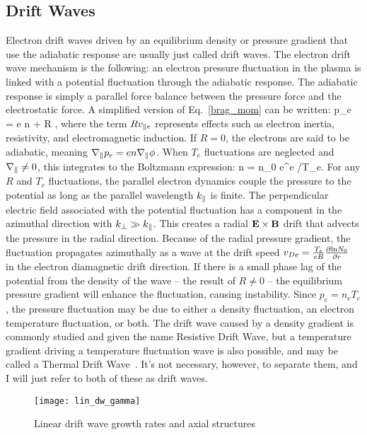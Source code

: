 \subsection{Drift Waves}
\label{ss_drift_waves}

Electron drift waves driven by an equilibrium density or pressure gradient that use the adiabatic response are usually just called drift waves.
The electron drift wave mechanism is the following: an electron pressure fluctuation in the plasma is linked with a potential fluctuation through the adiabatic response. The adiabatic
response is simply a parallel force balance between the pressure force and the electrostatic force. A simplified version of Eq.~\ref{brag_mom} can be written:
\beq
\label{adiabatic_response}
\gradpar p_e = e n \gradpar \phi + R \vpe,
\eeq
where the term $R v_{\parallel e}$ represents effects such as electron inertia, resistivity, and electromagnetic induction. If $R=0$, the electrons are said to be adiabatic, meaning 
$\nabla_\parallel p_e = e n \nabla_\parallel \phi$. When $T_e$ fluctuations are neglected and $\nabla_\parallel \ne 0$, this integrates to the Boltzmann expression:
\beq
\label{boltzmann_exp}
n = n_0 e^{e \phi/T_e}.
\eeq
For any $R$ and $T_e$ fluctuations, the parallel electron dynamics couple the pressure to the potential as long as the parallel wavelength $k_\parallel$ is finite. 
The perpendicular electric field associated with the potential fluctuation has a component in the azimuthal direction with $k_\perp \gg k_\parallel$. 
This creates a radial ${\bf E \times B}$ drift that advects the pressure in the radial direction. Because of the radial pressure gradient,
the fluctuation propagates azimuthally as a wave at the drift speed $v_{De} = \frac{T_e}{e B} \frac{\partial{\rm ln} N_0}{\partial r}$~\cite{chen2006} in the electron diamagnetic drift direction. 
If there is a small phase lag of the potential from the density of the wave -- the result of $R \ne 0$ -- the equilibrium pressure gradient will enhance the fluctuation, causing
instability. Since $p_e = n_e T_e$, the pressure fluctuation may be due to either a density fluctuation, an electron temperature fluctuation, or both. The drift wave caused by
a density gradient is commonly studied and given the name Resistive Drift Wave, but a temperature gradient driving a temperature fluctuation wave is also possible, and
may be called a Thermal Drift Wave~\cite{makwana2011}. It's not necessary, however, to separate them, and I will just refer to both of these as drift waves.

\begin{figure}
\centerline{\texttt{[image: lin\_dw\_gamma]}}
\caption{Linear drift wave growth rates and axial structures}
\label{lin_dw_gamma}
\end{figure}

